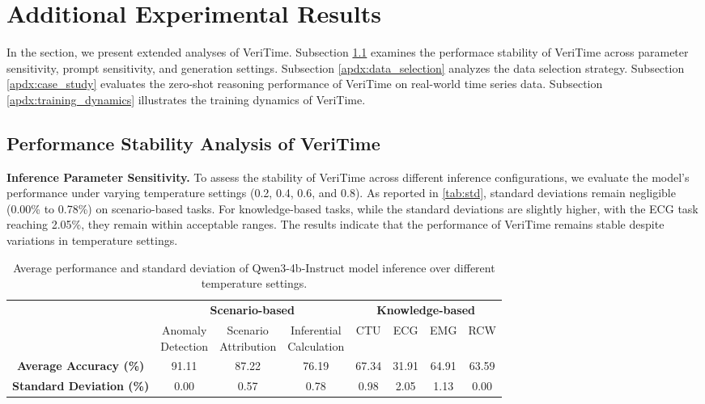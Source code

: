 \documentclass{article}
\theoremstyle{plain}
\theoremstyle{definition}
\theoremstyle{remark}
\begin{document}
\section{Additional Experimental Results}
\label{apdx:additional_results}

In the section, we present extended analyses of VeriTime. Subsection \ref{apdx:performance_stability} examines the performace stability of VeriTime across parameter sensitivity, prompt sensitivity, and generation settings. Subsection \ref{apdx:data_selection} analyzes the data selection strategy. Subsection \ref{apdx:case_study} evaluates the zero-shot reasoning performance of VeriTime on real-world time series data. Subsection \ref{apdx:training_dynamics} illustrates the training dynamics of VeriTime.

\subsection{Performance Stability Analysis of VeriTime} 
\label{apdx:performance_stability}

\textbf{Inference Parameter Sensitivity.} To assess the stability of VeriTime across different inference configurations, we evaluate the model's performance under varying temperature settings (0.2, 0.4, 0.6, and 0.8). As reported in \autoref{tab:std}, standard deviations remain negligible (0.00\% to 0.78\%) on scenario-based tasks. For knowledge-based tasks, while the standard deviations are slightly higher, with the ECG task reaching 2.05\%, they remain within acceptable ranges. The results indicate that the performance of VeriTime remains stable despite variations in temperature settings.

\begin{table}[htbp]
\centering
\small
\caption{Average performance and standard deviation of Qwen3-4b-Instruct model inference over different temperature settings.}
\label{tab:std}
\begin{tabular}{cccccccc}
\toprule
&\multicolumn{3}{c}{\textbf{Scenario-based}} & \multicolumn{4}{c}{\textbf{Knowledge-based}} \\
\cmidrule(lr){2-4} \cmidrule(lr){5-8}
 & \makecell{Anomaly \\ Detection} & \makecell{Scenario \\ Attribution} & \makecell{Inferential \\ Calculation} & CTU & ECG & EMG & RCW \\
\midrule
\textbf{Average Accuracy (\%)} & 91.11 & 87.22 & 76.19 & 67.34 & 31.91 & 64.91 & 63.59 \\
\textbf{Standard Deviation (\%)} & 0.00 & 0.57 & 0.78 & 0.98 & 2.05 & 1.13 & 0.00 \\
\bottomrule
\end{tabular}
\end{table}
\end{document}
